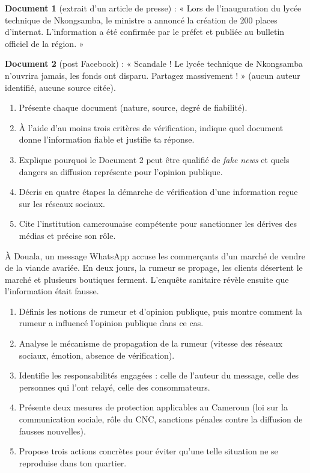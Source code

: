 \documentclass[11pt]{article}
\begin{document}
\begin{exercice}
\textbf{Document 1} (extrait d'un article de presse) : « Lors de l'inauguration du lycée technique de Nkongsamba, le ministre a annoncé la création de 200 places d'internat. L'information a été confirmée par le préfet et publiée au bulletin officiel de la région. »

\textbf{Document 2} (post Facebook) : « Scandale ! Le lycée technique de Nkongsamba n'ouvrira jamais, les fonds ont disparu. Partagez massivement ! » (aucun auteur identifié, aucune source citée).
\begin{enumerate}
\item Présente chaque document (nature, source, degré de fiabilité).
\item À l'aide d'au moins trois critères de vérification, indique quel document donne l'information fiable et justifie ta réponse.
\item Explique pourquoi le Document 2 peut être qualifié de \emph{fake news} et quels dangers sa diffusion représente pour l'opinion publique.
\item Décris en quatre étapes la démarche de vérification d'une information reçue sur les réseaux sociaux.
\item Cite l'institution camerounaise compétente pour sanctionner les dérives des médias et précise son rôle.
\end{enumerate}
\end{exercice}

\begin{exercice}
À Douala, un message WhatsApp accuse les commerçants d'un marché de vendre de la viande avariée. En deux jours, la rumeur se propage, les clients désertent le marché et plusieurs boutiques ferment. L'enquête sanitaire révèle ensuite que l'information était fausse.
\begin{enumerate}
\item Définis les notions de rumeur et d'opinion publique, puis montre comment la rumeur a influencé l'opinion publique dans ce cas.
\item Analyse le mécanisme de propagation de la rumeur (vitesse des réseaux sociaux, émotion, absence de vérification).
\item Identifie les responsabilités engagées : celle de l'auteur du message, celle des personnes qui l'ont relayé, celle des consommateurs.
\item Présente deux mesures de protection applicables au Cameroun (loi sur la communication sociale, rôle du CNC, sanctions pénales contre la diffusion de fausses nouvelles).
\item Propose trois actions concrètes pour éviter qu'une telle situation ne se reproduise dans ton quartier.
\end{enumerate}
\end{exercice}
\end{document}
